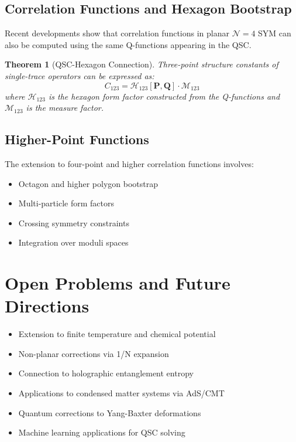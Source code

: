 \documentclass[11pt]{article}
\newtheorem{theorem}{Theorem}
\begin{document}
\subsection{Correlation Functions and Hexagon Bootstrap}

Recent developments show that correlation functions in planar $\mathcal{N}=4$ SYM can also be computed using the same Q-functions appearing in the QSC.

\begin{theorem}[QSC-Hexagon Connection]
Three-point structure constants of single-trace operators can be expressed as:
\begin{equation}
C_{123} = \mathcal{H}_{123}[\mathbf{P}, \mathbf{Q}] \cdot \mathcal{M}_{123}
\end{equation}
where $\mathcal{H}_{123}$ is the hexagon form factor constructed from the Q-functions and $\mathcal{M}_{123}$ is the measure factor.
\end{theorem}

\subsection{Higher-Point Functions}

The extension to four-point and higher correlation functions involves:
\begin{itemize}
\item Octagon and higher polygon bootstrap
\item Multi-particle form factors
\item Crossing symmetry constraints
\item Integration over moduli spaces
\end{itemize}

\section{Open Problems and Future Directions}

\begin{itemize}
\item Extension to finite temperature and chemical potential
\item Non-planar corrections via 1/N expansion
\item Connection to holographic entanglement entropy
\item Applications to condensed matter systems via AdS/CMT
\item Quantum corrections to Yang-Baxter deformations
\item Machine learning applications for QSC solving
\end{itemize}
\end{document}
